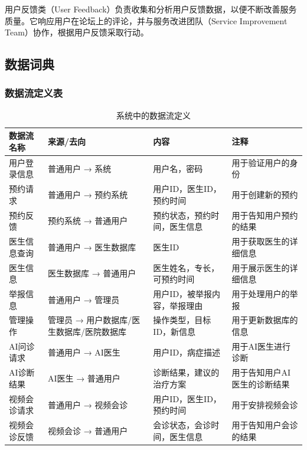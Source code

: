 用户反馈类（User Feedback）负责收集和分析用户反馈数据，以便不断改善服务质量。它响应用户在论坛上的评论，并与服务改进团队（Service Improvement Team）协作，根据用户反馈采取行动。

\subsection{数据词典}
\subsubsection{数据流定义表}
\begin{table}[htbp]
	\centering
	\begin{tabular}{|l|p{4cm}|p{4cm}|p{4cm}|}
		\hline
		\textbf{数据流名称} & \textbf{来源/去向} & \textbf{内容} & \textbf{注释} \\
		\hline
		用户登录信息 & 普通用户 
		→ 系统 & 用户名，密码 & 用于验证用户的身份 \\
		预约请求 & 普通用户 
		→ 预约系统 & 用户ID，医生ID，预约时间 & 用于创建新的预约 \\
		预约反馈 & 预约系统 
		→ 普通用户 & 预约状态，预约时间，医生信息 & 用于告知用户预约的结果 \\
		医生信息查询 & 普通用户 
		→ 医生数据库 & 医生ID & 用于获取医生的详细信息 \\
		医生信息 & 医生数据库 
		→ 普通用户 & 医生姓名，专长，可预约时间 & 用于展示医生的详细信息 \\
		举报信息 & 普通用户 
		→ 管理员 & 用户ID，被举报内容，举报理由 & 用于处理用户的举报 \\
		管理操作 & 管理员 
		→ 用户数据库/医生数据库/医院数据库 & 操作类型，目标ID，新信息 & 用于更新数据库的信息 \\
		AI问诊请求 & 普通用户 
		→ AI医生 & 用户ID，病症描述 & 用于AI医生进行诊断 \\
		AI诊断结果 & AI医生 
		→ 普通用户 & 诊断结果，建议的治疗方案 & 用于告知用户AI医生的诊断结果 \\
		视频会诊请求 & 普通用户 
		→ 视频会诊 & 用户ID，医生ID，预约时间 & 用于安排视频会诊 \\
		视频会诊反馈 & 视频会诊 
		→ 普通用户 & 会诊状态，会诊时间，医生信息 & 用于告知用户会诊的结果 \\
		\hline
	\end{tabular}
	\caption{系统中的数据流定义}
	\label{tab:data_flows}
\end{table}
\newpage

